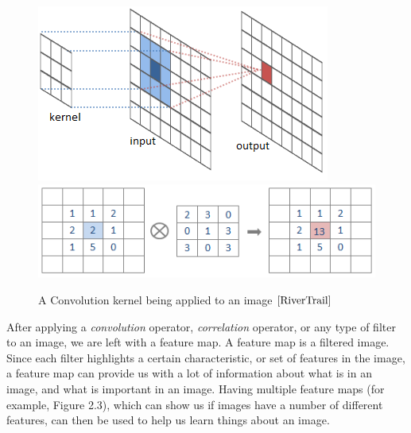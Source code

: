 \documentclass[12pt]{report} %
\begin{document}
\begin{figure}
\centering
\includegraphics{RiverTrain-ImageConvDiagram} 
\includegraphics{convolution4}
\caption[Convolution Kernel Applied to Image]
	{A Convolution kernel being applied to an image $\cite{RiverTrail}$}
\end{figure}	 
	 
	 After applying a \emph{convolution} operator, \emph{correlation} operator, or any type of filter to an image, we are left with a feature map. A feature map is a filtered image. Since each filter highlights a certain characteristic, or set of features in the image, a feature map can provide us with a lot of information about what is in an image, and what is important in an image\cite{aurelienMachineLearning}. Having multiple feature maps (for example, Figure 2.3), which can show us if images have a number of different features, can then be used to help us learn things about an image.
\end{document}

